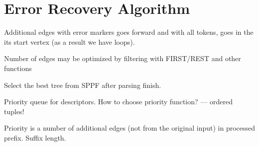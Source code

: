 \section{Error Recovery Algorithm}


Additional edges with error markers goes forward and with all tokens, goes in the its start vertex
(as a result we have loops).



Number of edges may be optimized by filtering with FIRST/REST and other functions

Select the best tree from SPPF after parsing finish.

Priority queue for descriptors.
How to choose priority function? --- ordered tuples!

Priority is a number of additional edges (not from the original input) in processed prefix.
Suffix length.
